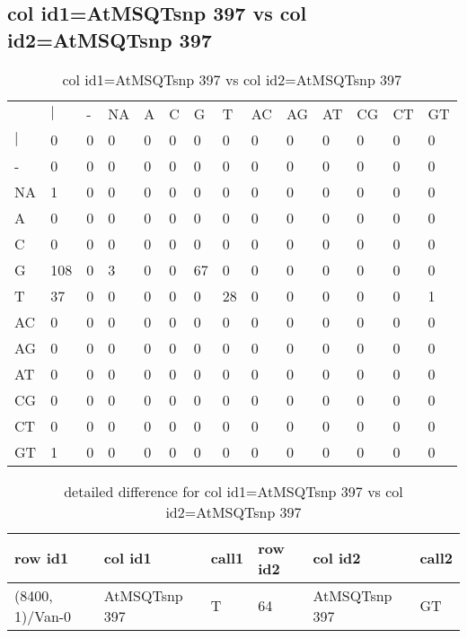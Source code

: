 \subsection{col id1=AtMSQTsnp 397 vs col id2=AtMSQTsnp 397}
\begin{center}
\begin{longtable}{|l|l|l|l|l|l|l|l|l|l|l|l|l|l|}
\caption{col id1=AtMSQTsnp 397 vs col id2=AtMSQTsnp 397} \label{table_dm716}\\
\hline
\\
\hline
&$|$&-&NA&A&C&G&T&AC&AG&AT&CG&CT&GT\\
$|$&0&0&0&0&0&0&0&0&0&0&0&0&0\\
-&0&0&0&0&0&0&0&0&0&0&0&0&0\\
NA&1&0&0&0&0&0&0&0&0&0&0&0&0\\
A&0&0&0&0&0&0&0&0&0&0&0&0&0\\
C&0&0&0&0&0&0&0&0&0&0&0&0&0\\
G&108&0&3&0&0&67&0&0&0&0&0&0&0\\
T&37&0&0&0&0&0&28&0&0&0&0&0&1\\
AC&0&0&0&0&0&0&0&0&0&0&0&0&0\\
AG&0&0&0&0&0&0&0&0&0&0&0&0&0\\
AT&0&0&0&0&0&0&0&0&0&0&0&0&0\\
CG&0&0&0&0&0&0&0&0&0&0&0&0&0\\
CT&0&0&0&0&0&0&0&0&0&0&0&0&0\\
GT&1&0&0&0&0&0&0&0&0&0&0&0&0\\
\hline
\end{longtable}
\end{center}

\begin{center}
\begin{longtable}{|l|l|l|l|l|l|}
\caption{detailed difference for col id1=AtMSQTsnp 397 vs col id2=AtMSQTsnp 397} \label{table_dm717}\\
\hline
row id1&col id1&call1&row id2&col id2&call2\\
\hline
(8400, 1)/Van-0&AtMSQTsnp 397&T&64&AtMSQTsnp 397&GT\\
\hline
\end{longtable}
\end{center}

